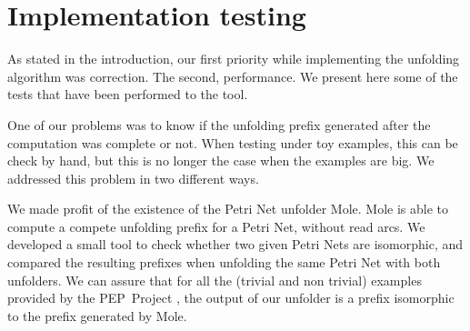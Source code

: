\documentclass[11pt,a4paper]{article}
\newcommand{\peupdate}{\mbox{\sf pe\_update}}
\begin{document}

\section{Implementation testing}
\label{sec:implementation}

As stated in the introduction, our first priority while implementing the
unfolding algorithm was correction.  The second, performance.  We present here
some of the tests that have been performed to the tool.

One of our problems was to know if the unfolding prefix generated after the
computation was complete or not.  When testing under toy examples, this can be
check by hand, but this is no longer the case when the examples are big.  We
addressed this problem in two different ways.

We made profit of the existence of the Petri Net unfolder Mole.  Mole is able
to compute a compete unfolding prefix for a Petri Net, without read arcs.  We
developed a small tool to check whether two given Petri Nets are isomorphic,
and compared the resulting prefixes when unfolding the same Petri Net with both
unfolders.  We can assure that for all the (trivial and non trivial) examples
provided by the PEP~Project , the output of our unfolder is a prefix
isomorphic to the prefix generated by Mole.
\end{document}
